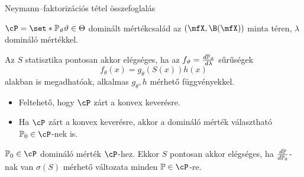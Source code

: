 \documentclass[aspectratio=169,notheorems,9pt,\option]{beamer}
\begin{document}
\begin{frame}[<*>]{Neymann--faktorizációs tétel összefoglalás}
\begin{theorem}
  $\cP=\set*{\P[\theta]}{\theta\in\Theta}$ dominált mértékcsalád az 
  $(\mfX,\B(\mfX))$ minta téren, $\lambda$ domináló mértékkel. 
  
  Az $S$  statisztika pontosan akkor elégséges, ha az 
  $f_\theta=\frac{d\P[\theta]}{d\lambda}$ 
  sűrűségek
  \begin{displaymath}
    f_{\theta}(x)=g_{\theta}(S(x))h(x)  %
  \end{displaymath}
  alakban is megadhatóak, 
  alkalmas $g_\theta,h$ mérhető függvényekkel.
\end{theorem}
\begin{itemize}
  \item Feltehető, hogy $\cP$ zárt a konvex keverésre.
  \item Ha $\cP$ zárt a konvex keverésre, akkor a domináló mérték választható $\P[0]\in\cP$-nek is.
\end{itemize}
\begin{lemma}
  $\P[0]\in\cP$ domináló mérték $\cP$-hez. Ekkor $S$ pontosan akkor elégséges, ha $\frac{d\P}{d\P[0]}$-nak 
  van $\sigma(S)$ mérhető változata minden $\P\in\cP$-re.
\end{lemma}
\end{frame}
\end{document}
